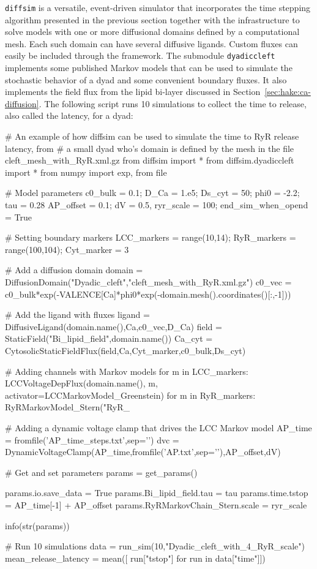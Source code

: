 \texttt{diffsim} is a versatile, event-driven simulator that
incorporates the time stepping algorithm presented in the previous
section together with the infrastructure to solve models with one or
more diffusional domains defined by a computational mesh. Each such
domain can have several diffusive ligands. Custom fluxes can easily be
included through the framework. The submodule \texttt{dyadiccleft}
implements some published Markov models that can be used to simulate
the stochastic behavior of a dyad and some convenient boundary
fluxes. It also implements the field flux from the lipid bi-layer
discussed in Section~\ref{sec:hake:ca-diffusion}. The following script
runs 10 simulations to collect the time to release, also called the
latency, for a dyad:
\begin{python}
# An example of how diffsim can be used to simulate the time to RyR release latency, from
# a small dyad who's domain is defined by the mesh in the file cleft_mesh_with_RyR.xml.gz
from diffsim import *
from diffsim.dyadiccleft import *
from numpy import exp, from file

# Model parameters
c0_bulk = 0.1; D_Ca = 1.e5; Ds_cyt = 50; phi0 = -2.2; tau = 0.28
AP_offset = 0.1; dV = 0.5, ryr_scale = 100; end_sim_when_opend = True

# Setting boundary markers
LCC_markers = range(10,14); RyR_markers = range(100,104); Cyt_marker = 3

# Add a diffusion domain
domain = DiffusionDomain("Dyadic_cleft","cleft_mesh_with_RyR.xml.gz")
c0_vec = c0_bulk*exp(-VALENCE[Ca]*phi0*exp(-domain.mesh().coordinates()[:,-1]))

# Add the ligand with fluxes
ligand = DiffusiveLigand(domain.name(),Ca,c0_vec,D_Ca)
field  = StaticField("Bi_lipid_field",domain.name())
Ca_cyt = CytosolicStaticFieldFlux(field,Ca,Cyt_marker,c0_bulk,Ds_cyt)

# Adding channels with Markov models
for m in LCC_markers:
    LCCVoltageDepFlux(domain.name(), m, activator=LCCMarkovModel_Greenstein)
for m in RyR_markers:
    RyRMarkovModel_Stern("RyR_%

# Adding a dynamic voltage clamp that drives the LCC Markov model
AP_time = fromfile('AP_time_steps.txt',sep='\n')
dvc = DynamicVoltageClamp(AP_time,fromfile('AP.txt',sep='\n'),AP_offset,dV)

# Get and set parameters
params = get_params()

params.io.save_data = True
params.Bi_lipid_field.tau = tau
params.time.tstop = AP_time[-1] + AP_offset
params.RyRMarkovChain_Stern.scale = ryr_scale

info(str(params))

# Run 10  simulations
data = run_sim(10,"Dyadic_cleft_with_4_RyR_scale")
mean_release_latency = mean([ run["tstop"] for run in data["time"]])
\end{python}
